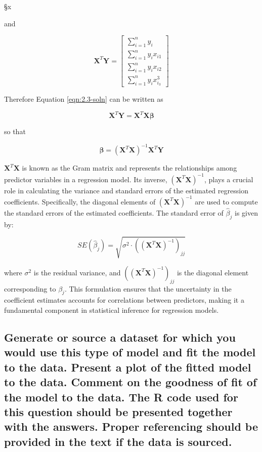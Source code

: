 §x\documentclass[]{article}
\begin{document}
\noindent and

$$
\textbf{X}^T \textbf{Y}
=
\begin{bmatrix}
	\sum_{i=1}^{n}y_i \\
	\sum_{i=1}^{n}y_ix_{i1}\\
	\sum_{i=1}^{n}y_ix_{i2}\\
	\sum_{i=1}^{n}y_ix_{i_3}^3
\end{bmatrix}
$$

\noindent Therefore Equation \ref{eqn:2.3-soln} can be written as

\begin{equation}
	\mathbf{X}^T \mathbf{Y} = \mathbf{X}^T \mathbf{X} \boldsymbol{\beta}
\end{equation}

\noindent so that

\begin{equation}
	\boldsymbol{\beta} = (\mathbf{X}^T \mathbf{X})^{-1} \mathbf{X}^T \mathbf{Y}
\end{equation}


$\mathbf{X}^T \mathbf{X}$  is known as the Gram matrix and represents the relationships among predictor variables in a regression model. Its inverse, $(\mathbf{X}^T \mathbf{X})^{-1}$, plays a crucial role in calculating the variance and standard errors of the estimated regression coefficients. Specifically, the diagonal elements of $(\mathbf{X}^T \mathbf{X})^{-1}$ are used to compute the standard errors of the estimated coefficients. The standard error of $\hat{\beta}_j$ is given by:

$$
SE(\hat{\beta}_j) = \sqrt{\sigma^2 \cdot \left( (\mathbf{X}^T \mathbf{X})^{-1} \right)_{jj}}
$$

where $\sigma^2$ is the residual variance, and $\left( (\mathbf{X}^T \mathbf{X})^{-1} \right)_{jj}$ is the diagonal element corresponding to $\beta_j$. This formulation ensures that the uncertainty in the coefficient estimates accounts for correlations between predictors, making it a fundamental component in statistical inference for regression models.


\subsection{ Generate or source a dataset for which you would use this type of model and fit the model to the data.  Present a plot of the fitted model to the data.  Comment on the goodness of fit of the model to the data.  The R code used for this question should be presented together with the answers. Proper referencing should be provided in the text if the data is sourced.}
\end{document}
